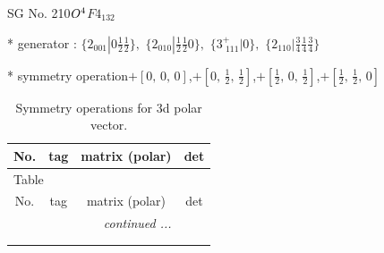 \documentclass[fleqn,8pt]{jsarticle}
\begin{document}
\setcounter{MaxMatrixCols}{32}

\renewcommand{\tablename}{Table~}
\renewcommand{\figurename}{Figure~}
\begin{center}
\LARGE
SG No. 210\quad$O_{\rm }^{4}$\quad$F4_132$\quad[ cubic ]
\end{center}

* generator : $\{2{}_{001}|0 \frac{1}{2} \frac{1}{2}\},\,\,\{2{}_{010}|\frac{1}{2} \frac{1}{2} 0\},\,\,\{3^{+}_{\,\,111}|0\},\,\,\{2{}_{110}|\frac{3}{4} \frac{1}{4} \frac{3}{4}\}$

* symmetry operation\quad$+\left[ 0,\, 0,\, 0 \right]$,\quad $+\left[ 0,\, \frac{1}{2},\, \frac{1}{2} \right]$,\quad $+\left[ \frac{1}{2},\, 0,\, \frac{1}{2} \right]$,\quad $+\left[ \frac{1}{2},\, \frac{1}{2},\, 0 \right]$
\renewcommand{\arraystretch}{1.3}
\begin{longtable}{cccc}
\caption{Symmetry operations for 3d polar vector.}
 \\
 \hline \hline
No. & tag & matrix (polar) & det \\ \hline \endfirsthead

\multicolumn{3}{l}{\tablename\ \thetable{}} \\
 \hline \hline
No. & tag & matrix (polar) & det \\ \hline \endhead

 \hline \hline
\multicolumn{3}{r}{\footnotesize\it continued ...} \\ \endfoot

 \hline \hline
\multicolumn{3}{r}{} \\ \endlastfoot


\end{longtable}
\end{document}
